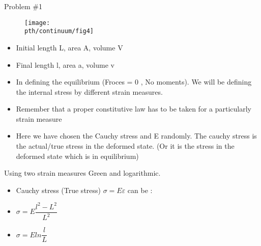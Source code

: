 	\begin{frame}{Problem \#1}
	\begin{figure}
		\centering
		\texttt{[image: \\pth/continuum/fig4]}
		\caption{}
		\label{fig:fig1}
	\end{figure}
	\begin{itemize}
		\item Initial length L, area A, volume V
		\item  Final length l, area a, volume v
		
	\end{itemize}
	\end{frame}

	\begin{frame}
		\begin{itemize}
			\item In defining the equilibrium (Froces = 0 , No moments). We will be defining the internal stress by different strain measures.
			\item Remember that a proper constitutive law has to be taken for a particularly strain measure
			\item Here we have chosen the Cauchy stress and E randomly. The cauchy stress is the actual/true stress in the deformed state. (Or it is the stress in the deformed state which is in equilibrium)
			
		\end{itemize}
		\begin{block}{Using two strain measures}
			Green and logarithmic.
			\begin{itemize}
				\item Cauchy stress (True stress) $\sigma = E \varepsilon$ can be :
				\item $\sigma = E \dfrac{l^2-L^2}{L^2}$
				\item $\sigma = E ln\dfrac{l}{L}$
			\end{itemize}
		\end{block}
	\end{frame}

